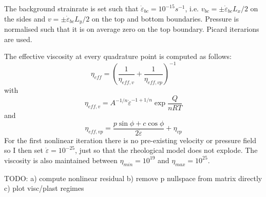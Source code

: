 The background strainrate is set such that $\dot{\varepsilon}_{bc}=10^{-15}s^{-1}$, i.e. 
$v_{bc}=\pm \dot{\varepsilon}_{bc} L_x/2 $ on the sides and $v=\pm \dot{\varepsilon}_{bc} L_y/2 $
on the top and bottom boundaries.
Pressure is normalised such that it is on average zero on the top boundary. 
Picard iterarions are used. 

The effective viscosity at every quadrature point is computed as follows:
\[
\eta_{eff} = \left( \frac{1}{\eta_{eff,v}}  + \frac{1}{\eta_{eff,vp}}  \right)^{-1}
\]
with 
\[
\eta_{eff,v} = A^{-1/n} \dot{\varepsilon}^{-1+1/n} \exp \frac{Q}{nRT}
\]
and 
\[
\eta_{eff,vp} = \frac{p \sin \phi + c \cos \phi}{2 \dot{\varepsilon}}  + \eta_{vp}
\]
For the first nonlinear iteration there is no pre-existing velocity or pressure field so 
I then set $\dot{\varepsilon}=10^{-25}$, just so that the rheological model does not explode. 
The viscosity is also maintained between $\eta_{min}=10^{19}$ and $\eta_{max}=10^{25}$.

TODO: a) compute nonlinear residual b) remove p nullspace from matrix directly c) plot visc/plast regimes



